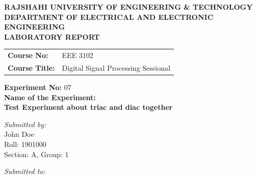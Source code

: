 \documentclass[12pt,a4paper]{article}
\begin{document}
\begin{titlepage}
    \sffamily
    \centering
    \vspace*{1cm}
    
    \Large \textbf{\MakeUppercase{ Rajshahi University of Engineering \& Technology }} \\
    \vspace{0.5cm}
    \large \textbf{\MakeUppercase{ Department of Electrical and Electronic Engineering }} \\
    
    \vspace{2.5cm}
    \Large \textbf{LABORATORY REPORT} \\
    \vspace{1cm}
    
    \begin{tabular}{ll}
        \textbf{Course No:} & EEE 3102 \\
        \textbf{Course Title:} & Digital Signal Processing Sessional \\
    \end{tabular}
    
    \vspace{2cm}
    
    \textbf{Experiment No:} 07 \\
    \vspace{0.5cm}
    \textbf{Name of the Experiment:} \\
    \Large \textbf{ Test Experiment about triac and diac together } \\
    
    \vspace{2.5cm}
    
    \begin{minipage}[t]{0.4\textwidth}
        \begin{flushleft} \large
            \emph{Submitted by:}\\
            John Doe \\
            Roll: 1901000 \\
            Section: A, Group: 1
        \end{flushleft}
    \end{minipage}
    \hfill
    \begin{minipage}[t]{0.5\textwidth}
        \begin{flushright} \large
            \emph{Submitted to:} \\
            

\end{flushright}
\end{minipage}
\end{titlepage}
\end{document}
